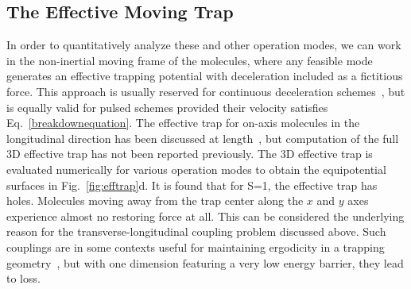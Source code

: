 \subsection{The Effective Moving Trap}
In order to quantitatively analyze these and other operation modes, we can work in the non-inertial moving frame of the molecules, where any feasible mode generates an effective trapping potential with deceleration included as a fictitious force. 
This approach is usually reserved for continuous deceleration schemes~\cite{Osterwalder2010,Narevicius2008}, but is equally valid for pulsed schemes provided their velocity satisfies Eq.~\ref{breakdownequation}. 
The effective trap for on-axis molecules in the longitudinal direction has been discussed at length~\cite{Bethlem2000,Hudson2004}, but computation of the full 3D effective trap has not been reported previously.
The 3D effective trap is evaluated numerically for various operation modes to obtain the equipotential surfaces in Fig.~\ref{fig:efftrap}d.
It is found that for S=1, the effective trap has holes. 
Molecules moving away from the trap center along the $x$ and $y$ axes experience almost no restoring force at all. 
This can be considered the underlying reason for the transverse-longitudinal coupling problem discussed above. 
Such couplings are in some contexts useful for maintaining ergodicity in a trapping geometry~\cite{Surkov1996}, but with one dimension featuring a very low energy barrier, they lead to loss.

